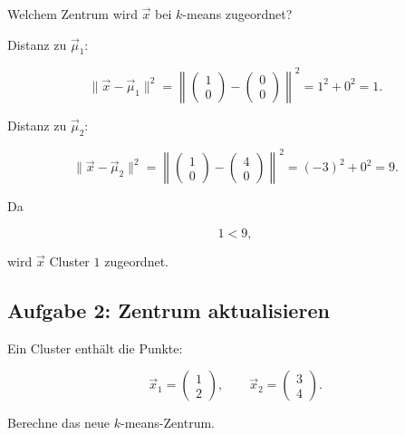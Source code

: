 Welchem Zentrum wird \(\vec{x}\) bei \(k\)-means zugeordnet?

\begin{examplebox}
Distanz zu \(\vec{\mu}_1\):

\[
    \|\vec{x}-\vec{\mu}_1\|^2
    =
    \left\|
    \begin{pmatrix}
        1 \\
        0
    \end{pmatrix}
    -
    \begin{pmatrix}
        0 \\
        0
    \end{pmatrix}
    \right\|^2
    =
    1^2+0^2
    =
    1.
\]

Distanz zu \(\vec{\mu}_2\):

\[
    \|\vec{x}-\vec{\mu}_2\|^2
    =
    \left\|
    \begin{pmatrix}
        1 \\
        0
    \end{pmatrix}
    -
    \begin{pmatrix}
        4 \\
        0
    \end{pmatrix}
    \right\|^2
    =
    (-3)^2+0^2
    =
    9.
\]

Da

\[
    1<9,
\]

wird \(\vec{x}\) Cluster \(1\) zugeordnet.
\end{examplebox}

\subsection{Aufgabe 2: Zentrum aktualisieren}

Ein Cluster enthält die Punkte:

\[
    \vec{x}_1
    =
    \begin{pmatrix}
        1 \\
        2
    \end{pmatrix},
    \qquad
    \vec{x}_2
    =
    \begin{pmatrix}
        3 \\
        4
    \end{pmatrix}.
\]

Berechne das neue \(k\)-means-Zentrum.

